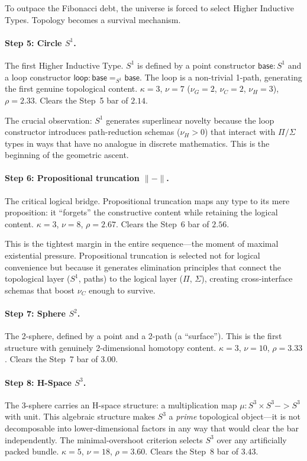 \documentclass[11pt,a4paper]{article}
\def\to{->}%
\theoremstyle{plain}
\theoremstyle{definition}
\theoremstyle{remark}
\begin{document}
To outpace the Fibonacci debt, the universe is forced to select Higher Inductive Types.  Topology becomes a survival mechanism.

\paragraph{Step 5: Circle $S^1$.}  The first Higher Inductive Type.  $S^1$ is defined by a point constructor $\mathsf{base} : S^1$ and a loop constructor $\mathsf{loop} : \mathsf{base} =_{S^1} \mathsf{base}$.  The loop is a non-trivial 1-path, generating the first genuine topological content.  $\kappa = 3$, $\nu = 7$ ($\nu_G = 2$, $\nu_C = 2$, $\nu_H = 3$), $\rho = 2.33$.  Clears the Step~5 bar of $2.14$.

The crucial observation: $S^1$ generates superlinear novelty because the loop constructor introduces path-reduction schemas ($\nu_H > 0$) that interact with $\Pi/\Sigma$ types in ways that have no analogue in discrete mathematics.  This is the beginning of the geometric ascent.

\paragraph{Step 6: Propositional truncation $\| - \|$.}  The critical logical bridge.  Propositional truncation maps any type to its mere proposition: it ``forgets'' the constructive content while retaining the logical content.  $\kappa = 3$, $\nu = 8$, $\rho = 2.67$.  Clears the Step~6 bar of $2.56$.

This is the tightest margin in the entire sequence---the moment of maximal existential pressure.  Propositional truncation is selected not for logical convenience but because it generates elimination principles that connect the topological layer ($S^1$, paths) to the logical layer ($\Pi$, $\Sigma$), creating cross-interface schemas that boost $\nu_C$ enough to survive.

\paragraph{Step 7: Sphere $S^2$.}  The 2-sphere, defined by a point and a 2-path (a ``surface'').  This is the first structure with genuinely 2-dimensional homotopy content.  $\kappa = 3$, $\nu = 10$, $\rho = 3.33$.  Clears the Step~7 bar of $3.00$.

\paragraph{Step 8: H-Space $S^3$.}  The 3-sphere carries an H-space structure: a multiplication map $\mu : S^3 \times S^3 \to S^3$ with unit.  This algebraic structure makes $S^3$ a \emph{prime} topological object---it is not decomposable into lower-dimensional factors in any way that would clear the bar independently.  The minimal-overshoot criterion selects $S^3$ over any artificially packed bundle.  $\kappa = 5$, $\nu = 18$, $\rho = 3.60$.  Clears the Step~8 bar of $3.43$.
\end{document}
